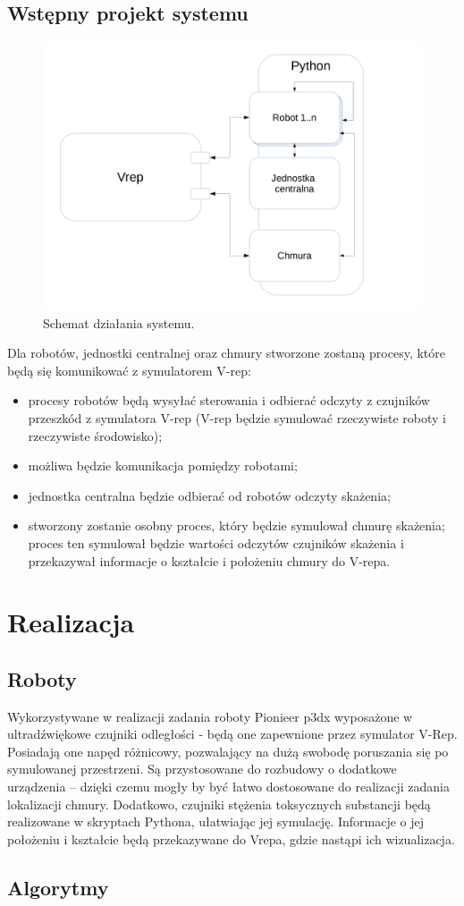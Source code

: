\documentclass[a4paper, 12pt]{article}
\begin{document}
	\subsection{Wstępny projekt systemu}	
	\begin{figure}[h!]
	\centering
	\includegraphics[width=0.9\columnwidth]{img/schemat_sst_1.pdf}
	\caption{Schemat działania systemu.}
	\end{figure}
	Dla robotów, jednostki centralnej oraz chmury stworzone zostaną procesy, które będą się komunikować z symulatorem V-rep:
	\begin{itemize}
		\item procesy robotów będą wysyłać sterowania i odbierać odczyty z czujników przeszkód z symulatora V-rep (V-rep będzie symulować rzeczywiste roboty i rzeczywiste środowisko);
		\item możliwa będzie komunikacja pomiędzy robotami;
		\item jednostka centralna będzie odbierać od robotów odczyty skażenia;
		\item stworzony zostanie osobny proces, który będzie symulował chmurę skażenia; proces ten symulował będzie wartości odczytów czujników skażenia i przekazywał informacje o kształcie i położeniu chmury do V-repa.
	\end{itemize}
	
\section{Realizacja}

\subsection{Roboty}
Wykorzystywane w realizacji zadania roboty Pionieer p3dx wyposażone w ultradźwiękowe czujniki odległości - będą one zapewnione przez symulator V-Rep. Posiadają one napęd różnicowy, pozwalający na dużą swobodę poruszania się po symulowanej przestrzeni. Są przystosowane do rozbudowy o dodatkowe urządzenia -- dzięki czemu mogły by być łatwo dostosowane do realizacji zadania lokalizacji chmury.
Dodatkowo, czujniki stężenia toksycznych substancji będą realizowane w skryptach Pythona, ułatwiając jej symulację. Informacje o jej położeniu i kształcie będą przekazywane do Vrepa, gdzie nastąpi ich wizualizacja.
\subsection{Algorytmy}

	
\end{document}
